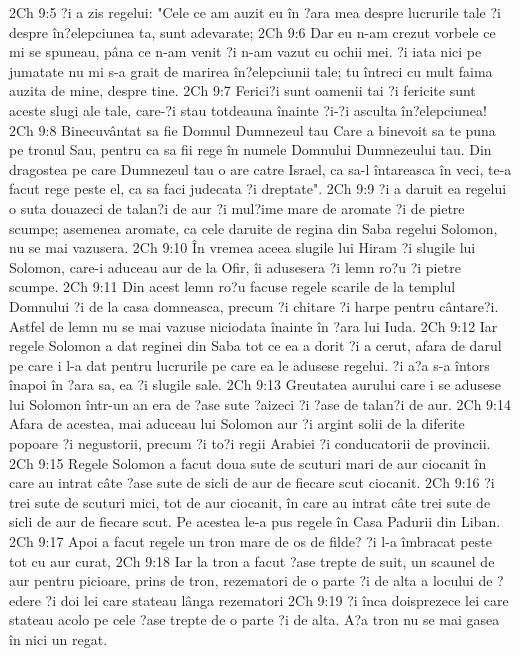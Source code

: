 2Ch 9:5  ?i a zis regelui: "Cele ce am auzit eu în ?ara mea despre lucrurile tale ?i despre în?elepciunea ta, sunt adevarate;
2Ch 9:6  Dar eu n-am crezut vorbele ce mi se spuneau, pâna ce n-am venit ?i n-am vazut cu ochii mei. ?i iata nici pe jumatate nu mi s-a grait de marirea în?elepciunii tale; tu întreci cu mult faima auzita de mine, despre tine.
2Ch 9:7  Ferici?i sunt oamenii tai ?i fericite sunt aceste slugi ale tale, care-?i stau totdeauna înainte ?i-?i asculta în?elepciunea!
2Ch 9:8  Binecuvântat sa fie Domnul Dumnezeul tau Care a binevoit sa te puna pe tronul Sau, pentru ca sa fii rege în numele Domnului Dumnezeului tau. Din dragostea pe care Dumnezeul tau o are catre Israel, ca sa-l întareasca în veci, te-a facut rege peste el, ca sa faci judecata ?i dreptate".
2Ch 9:9  ?i a daruit ea regelui o suta douazeci de talan?i de aur ?i mul?ime mare de aromate ?i de pietre scumpe; asemenea aromate, ca cele daruite de regina din Saba regelui Solomon, nu se mai vazusera.
2Ch 9:10  În vremea aceea slugile lui Hiram ?i slugile lui Solomon, care-i aduceau aur de la Ofir, îi adusesera ?i lemn ro?u ?i pietre scumpe.
2Ch 9:11  Din acest lemn ro?u facuse regele scarile de la templul Domnului ?i de la casa domneasca, precum ?i chitare ?i harpe pentru cântare?i. Astfel de lemn nu se mai vazuse niciodata înainte în ?ara lui Iuda.
2Ch 9:12  Iar regele Solomon a dat reginei din Saba tot ce ea a dorit ?i a cerut, afara de darul pe care i l-a dat pentru lucrurile pe care ea le adusese regelui. ?i a?a s-a întors înapoi în ?ara sa, ea ?i slugile sale.
2Ch 9:13  Greutatea aurului care i se adusese lui Solomon într-un an era de ?ase sute ?aizeci ?i ?ase de talan?i de aur.
2Ch 9:14  Afara de acestea, mai aduceau lui Solomon aur ?i argint solii de la diferite popoare ?i negustorii, precum ?i to?i regii Arabiei ?i conducatorii de provincii.
2Ch 9:15  Regele Solomon a facut doua sute de scuturi mari de aur ciocanit în care au intrat câte ?ase sute de sicli de aur de fiecare scut ciocanit.
2Ch 9:16  ?i trei sute de scuturi mici, tot de aur ciocanit, în care au intrat câte trei sute de sicli de aur de fiecare scut. Pe acestea le-a pus regele în Casa Padurii din Liban.
2Ch 9:17  Apoi a facut regele un tron mare de os de filde? ?i l-a îmbracat peste tot cu aur curat,
2Ch 9:18  Iar la tron a facut ?ase trepte de suit, un scaunel de aur pentru picioare, prins de tron, rezematori de o parte ?i de alta a locului de ?edere ?i doi lei care stateau lânga rezematori
2Ch 9:19  ?i înca doisprezece lei care stateau acolo pe cele ?ase trepte de o parte ?i de alta. A?a tron nu se mai gasea în nici un regat.
